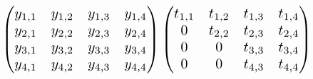 \documentclass[]{article}
\begin{document}
\begin{equation}
\resizebox{.9\hsize}{!}{$
	\begin{pmatrix}
	y_{1,1} & y_{1,2} & y_{1,3}  & y_{1,4} \\
	y_{2,1} & y_{2,2} & y_{2,3}  & y_{2,4} \\
	y_{3,1} & y_{3,2} & y_{3,3}  & y_{3,4} \\
	y_{4,1} & y_{4,2} & y_{4,3}  & y_{4,4} \\
	\end{pmatrix}
	\begin{pmatrix}
	t_{1,1} & t_{1,2} & t_{1,3}  & t_{1,4} \\
	0 & t_{2,2} & t_{2,3}  & t_{2,4} \\
	0 & 0 & t_{3,3}  & t_{3,4} \\
	0 & 0 & t_{4,3}  & t_{4,4} \\
	\end{pmatrix}
	$}
\end{equation}
%
%
\end{document}
